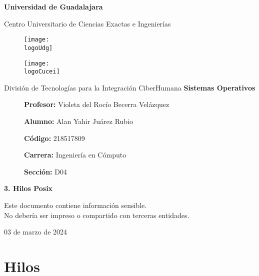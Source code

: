 \documentclass[12pt, a4paper]{article} %
\title{\theTitle}
\author{\theAuthor}
\newcommand{\logoUdg}{../../../../attachments/images/portada-udg.jpeg}
\newcommand{\logoCucei}{../../../../attachments/images/portada-cucei.jpeg}
\newcommand{\materia}{Sistemas Operativos}
\newcommand{\theTitle}{3. Hilos Posix}
\newcommand{\profesor}{Violeta del Rocío Becerra Velázquez}
\newcommand{\theAuthor}{Alan Yahir Juárez Rubio}
\newcommand{\code}{218517809}
\newcommand{\carrera}{Ingeniería en Cómputo}
\newcommand{\seccion}{D04}
\newcommand{\startDate}{03 de marzo de 2024}
\newcommand{\nl}{\par\vspace{0.4cm}}
\begin{document}
\cfoot{\ifodd\value{page}\else\thepage\fi} %

\begin{titlepage}
	\centering
	{\huge\textbf{Universidad de Guadalajara}}\par\vspace{0.6cm}
	{\LARGE{Centro Universitario de Ciencias Exactas e Ingenierías}}\vfill
	
	\begin{figure}[h]
		\begin{minipage}[t]{0.45\textwidth}
			\centering
			\texttt{[image: \\logoUdg]}
		\end{minipage}
		\hfill
		\begin{minipage}[t]{0.45\textwidth}
			\centering
			\texttt{[image: \\logoCucei]}
		\end{minipage}
	\end{figure}\vfill
	
	{\Large{División de Tecnologías para la Integración CiberHumana}}\vfill
	{\Large\textbf{\materia}}\vfill
	\begin{figure}[h]
		\centering
		\begin{minipage}[t]{0.75\textwidth}
			{\Large
				\textbf{Profesor:} \profesor\nl
				\textbf{Alumno:} \theAuthor\nl
				\textbf{Código:} \code\nl
				\textbf{Carrera:} \carrera\nl
				\textbf{Sección:} \seccion
			}
		\end{minipage}
	\end{figure}\vfill
	{\LARGE{\textbf{\theTitle}}}\vfill
	
	\begin{tcolorbox}[colback=red!5!white, colframe=red!75!black]
		\centering
		Este documento contiene información sensible.\\
		No debería ser impreso o compartido con terceras entidades.
	\end{tcolorbox}\vfill
	{\large \startDate}\par
\end{titlepage}

\clearpage
\tableofcontents

	

\clearpage
\section{Hilos}
\end{document}
